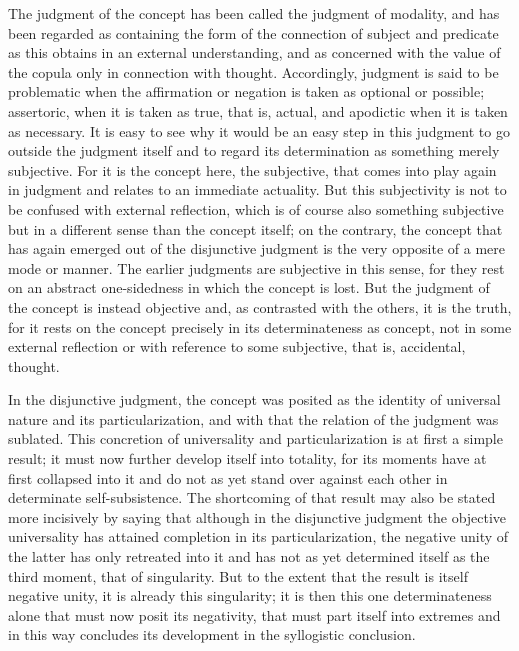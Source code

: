 The judgment of the concept has been called
the judgment of modality,
and has been regarded as containing
the form of the connection of subject and predicate
as this obtains in an external understanding,
and as concerned with the value of the copula
only in connection with thought.
Accordingly, judgment is said to be problematic
when the affirmation or negation is taken
as optional or possible;
assertoric, when it is taken as true, that is, actual,
and apodictic when it is taken as necessary.
It is easy to see why it would be an easy step
in this judgment to go outside the judgment itself
and to regard its determination as something merely subjective.
For it is the concept here, the subjective,
that comes into play again in judgment
and relates to an immediate actuality.
But this subjectivity is not to be confused
with external reflection,
which is of course also something subjective
but in a different sense than the concept itself;
on the contrary, the concept that has again emerged
out of the disjunctive judgment is
the very opposite of a mere mode or manner.
The earlier judgments are subjective in this sense,
for they rest on an abstract one-sidedness
in which the concept is lost.
But the judgment of the concept is instead objective
and, as contrasted with the others,
it is the truth,
for it rests on the concept precisely
in its determinateness as concept,
not in some external reflection
or with reference to some subjective,
that is, accidental, thought.

In the disjunctive judgment,
the concept was posited as the identity of
universal nature and its particularization,
and with that the relation of the judgment was sublated.
This concretion of universality and particularization
is at first a simple result;
it must now further develop itself into totality,
for its moments have at first collapsed into it
and do not as yet stand over against each other
in determinate self-subsistence.
The shortcoming of that result may also be stated
more incisively by saying that
although in the disjunctive judgment
the objective universality has attained completion
in its particularization,
the negative unity of the latter
has only retreated into it
and has not as yet determined itself as the third moment,
that of singularity.
But to the extent that the result is
itself negative unity,
it is already this singularity;
it is then this one determinateness alone
that must now posit its negativity,
that must part itself into extremes
and in this way concludes its development
in the syllogistic conclusion.

